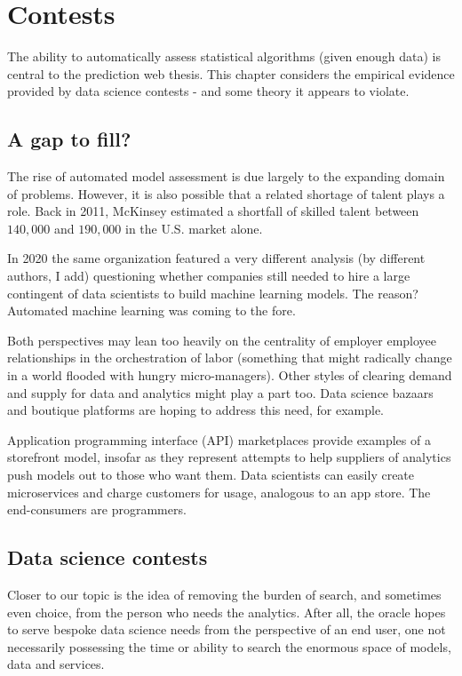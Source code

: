 \chapter{Contests}
\label{chapter:crowd}

The ability to automatically assess statistical algorithms (given enough data) is central to the prediction web thesis. This chapter considers the empirical evidence provided by data science contests - and some theory it appears to violate. 


\section{A gap to fill?}

The rise of automated model assessment is due largely to the expanding domain of problems. However, it is also possible that a related shortage of talent plays a role. Back in 2011, McKinsey estimated a shortfall of skilled talent between $140,000$ and $190,000$ in the U.S. market alone. 

In 2020 the same organization featured a very different analysis (by different authors, I add) questioning whether companies still needed to hire a large contingent of data scientists to build machine learning models. The reason? Automated machine learning was coming to the fore.

Both perspectives may lean too heavily on the centrality of employer employee relationships in the orchestration of labor (something that might radically change in a world flooded with hungry micro-managers). Other styles of clearing demand and supply for data and analytics might play a part too. Data science bazaars and boutique platforms are hoping to address this need, for example.

Application programming interface (API) marketplaces provide examples of a storefront model, insofar as they represent attempts to help suppliers of analytics push models out to those who want them. Data scientists can easily create microservices and charge customers for usage, analogous to an app store. The end-consumers are programmers. 

\section{Data science contests}

Closer to our topic is the idea of removing the burden of search, and sometimes even choice, from the person who needs the analytics. After all, the oracle hopes to serve bespoke data science needs from the perspective of an end user, one not necessarily possessing the time or ability to search the enormous space of models, data and services.

